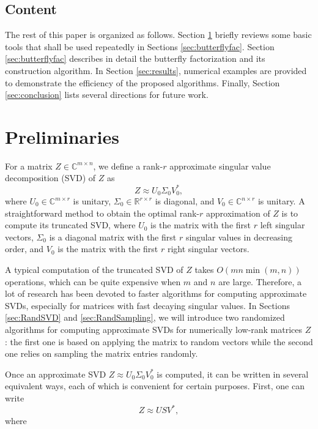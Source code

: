 \subsection{Content}

The rest of this paper is organized as follows. Section \ref{sec:prep}
briefly reviews some basic tools that shall be used repeatedly in Sections \ref{sec:butterflyfac}. Section \ref{sec:butterflyfac}
describes in detail the butterfly factorization and its construction algorithm. In Section \ref{sec:results}, numerical examples are provided to demonstrate the efficiency of the proposed algorithms. Finally, Section \ref{sec:conclusion} lists several directions for future work.

\section{Preliminaries}
\label{sec:prep}

For a matrix $Z \in \mathbb{C}^{m\times n}$, we define a rank-$r$ approximate singular value decomposition (SVD) of $Z$ as
\[
Z \approx U_0 \Sigma_0 V_0^*,
\]
where $U_0\in \mathbb{C}^{m\times r}$ is unitary, $\Sigma_0\in \mathbb{R}^{r\times
  r}$ is diagonal, and $V_0\in \mathbb{C}^{n\times r}$ is unitary. A straightforward method to obtain the optimal rank-$r$ approximation of $Z$ is to compute its truncated SVD, where $U_0$ is the matrix with the first $r$ left singular vectors, $\Sigma_0$ is a diagonal matrix with the first $r$ singular values in decreasing order, and $V_0$ is the matrix with the first $r$ right singular vectors.

A typical computation of the truncated {SVD} of $Z$ takes
$O(mn\min(m,n))$ operations, which can be quite expensive when $m$ and $n$ are large. Therefore, a lot of research has been devoted to faster algorithms for computing approximate SVDs, especially for matrices with fast decaying singular values. In Sections
\ref{sec:RandSVD} and \ref{sec:RandSampling}, we will introduce two randomized algorithms for computing approximate SVDs for numerically low-rank matrices $Z$: the first one \cite{Rec1} is based on applying the matrix to random vectors while the second one \cite{Butterfly4,symbol3} relies on sampling the matrix entries randomly.

Once an approximate SVD $Z \approx U_0 \Sigma_0 V_0^*$ is computed, it can be written in several equivalent ways, each of which is convenient for certain purposes. First, one can write
\[
Z \approx U S V^*,
\]
where

